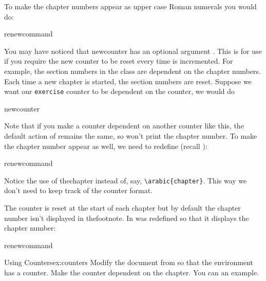 
To make the chapter numbers appear as upper case Roman 
numerals you would do:
\begin{codeS}
\gls{renewcommand}
\end{codeS}

You may have noticed that \gls{newcounter} has an optional
argument .  This is for use if you require the
new counter to be reset every time  is
incremented.  For example,
the section numbers in the  class are dependent on the
chapter numbers.  Each time a new chapter is started, the section
numbers are reset.  Suppose we want our \texttt{exercise} counter to
be dependent on the  counter, we would do
\begin{codeS}
\gls{newcounter}
\end{codeS}

Note that if you make a counter dependent on another counter like
this, the default action of  remains the
same, so  won't print the chapter number.
To make the chapter number appear as well, we need to redefine
 (recall ):
\begin{codeS}
\gls{renewcommand}
\end{codeS}%
Notice the use of \gls{thechapter} instead of,
say, \verb|\arabic{chapter}|.  This way
we don't need to keep track of the  counter format.


The  counter is reset at the start of each
chapter but by default the chapter number isn't displayed in
\gls{thefootnote}. In   was redefined so that it
displays the chapter number:
\begin{codeS}
\gls{renewcommand}
\end{codeS}

\begin{exercise}{Using Counters}{ex:counters}
Modify the document from  so that
the  environment has a counter.
Make the counter dependent on the chapter.
You can  an example.
\end{exercise}

